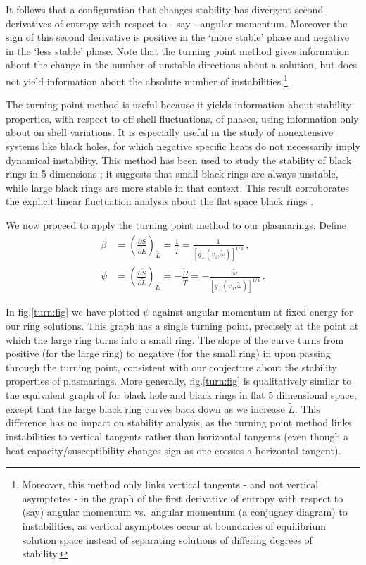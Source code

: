 \documentclass[12pt,a4paper]{article}
\newcommand{\pdiffc}[3][\rule{0mm}{0mm}]{\left (\frac{\partial #2}{\partial {#3}}\right )_{\!\!#1}}
\newcommand{\tE}{\widetilde{E}}
\newcommand{\tL}{\widetilde{L}}
\newcommand{\tS}{\widetilde{S}}
\newcommand{\tT}{\widetilde{T}}
\newcommand{\tO}{\widetilde{\Omega}}
\newcommand{\vo}{v_\mathrm{o}}
\newcommand{\tw}{\widetilde{\omega}}
\begin{document}
It follows that a configuration that changes stability has divergent
second derivatives of entropy with respect to - say - angular
momentum. Moreover the sign of this second derivative is positive in
the `more stable' phase and negative in the `less stable' phase.
Note that the turning point method gives information about the
change in the number of unstable directions about a solution, but
does not yield information about the absolute number of
instabilities.\footnote{Moreover, this method only links vertical
tangents - and not vertical asymptotes - in the graph of the first
derivative of entropy with respect to (say) angular momentum vs.\
angular momentum (a conjugacy diagram) to instabilities, as vertical
asymptotes occur at boundaries of equilibrium solution space instead
of separating solutions of differing degrees of stability.}

The turning point method is useful because it yields information
about stability properties, with respect to off shell fluctuations,
of phases, using information only about on shell variations. It is
especially useful in the study of nonextensive systems like black
holes, for which negative specific heats do not necessarily imply
dynamical instability. This method has been used to study the
stability of black rings in 5 dimensions \cite{Arcioni:2004ww,
Arcioni:2005fm}; it suggests that small black rings are always
unstable, while large black rings are more stable in that context.
This result corroborates the explicit linear fluctuation analysis
about the flat space black rings \cite{Elvang:2006dd}.

We now proceed to apply the turning point method to our plasmarings.
Define
%
\begin{align}
\label{betadef:eq}
  \beta &= \pdiffc[\tL]{\tS}{\tE} = \frac{1}{\tT} =
  \frac{1}{[g_+(\vo,\tw)]^{1/4}}\,,\\
\label{psidef:eq}
  \psi &= \pdiffc[\tE]{\tS}{\tL} = -\frac{\tO}{\tT} =
  -\frac{\tw}{[g_+(\vo,\tw)]^{1/4}}\,.
\end{align}
%

In fig.\ref{turn:fig} we have plotted $\psi$ against angular
momentum at fixed energy for our ring solutions. This graph has a
single turning point, precisely at the point at which the large ring
turns into a small ring. The slope of the curve turns from positive
(for the large ring) to negative (for the small ring) in upon
passing through the turning point, consistent with our conjecture
about the stability properties of plasmarings. More generally,
fig.\ref{turn:fig} is qualitatively similar to the equivalent graph
of \cite[fig.6(b)]{Arcioni:2004ww} for black hole and black rings in
flat 5 dimensional space, except that the large black ring curves
back down as we increase $\tL$. This difference has no impact on
stability analysis, as the turning point method links instabilities
to vertical tangents rather than horizontal tangents (even though a
heat capacity/susceptibility changes sign as one crosses a
horizontal tangent).
\end{document}

